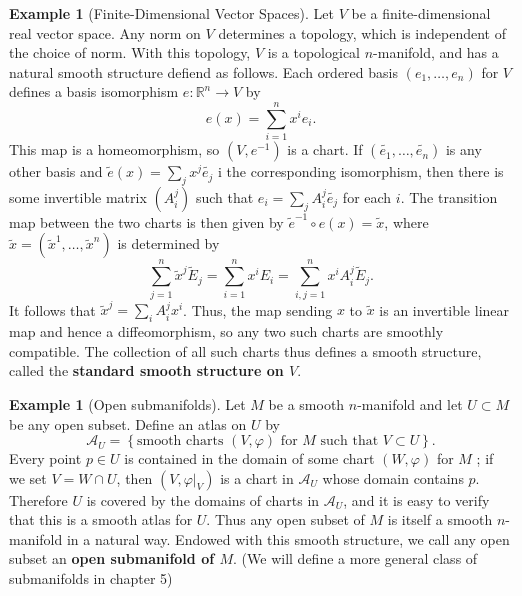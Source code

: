 \documentclass[reqno]{amsart}
\theoremstyle{plain}%
\theoremstyle{definition}
\newtheorem{example}[theorem]{Example}
\theoremstyle{remark}
\begin{document}
        \begin{example}[Finite-Dimensional Vector Spaces]
         Let $V$ be a finite-dimensional real vector space. Any norm on $V$ 
         determines a topology, which is independent of the choice of norm. With
         this topology, $V$ is a topological $n$-manifold, and has a natural smooth
         structure defiend as follows. Each ordered basis
         $\left( e_1, \ldots, e_n \right) $ for $V$ defines a basis isomorphism
         $e  \colon \mathbb{R}^{n} \to V$ by
         \[
         e(x) = \sum_{i=1}^{n} x^{i} e_i.
         \] 
         This map is a homeomorphism, so $\left( V, e^{-1} \right) $ is a chart. If
         $\left( \tilde{e_1}, \ldots,
         \tilde{e_n} \right) $ is any other basis and
         $\tilde{e}(x) = \sum_{j} x^{j}\tilde{e_j} $ i the corresponding
         isomorphism, then there is some invertible matrix
         $\left( A_{i}^{j} \right) $ such that
         $e_i = \sum_j A_{i}^{j} \tilde{e_j}$ for each $i$. The transition map
         between the two charts is then given by
         $\tilde{e}^{-1} \circ e(x) = \tilde{x}$, where $\tilde{x}
         = \left( \tilde{x}^{1},\ldots, \tilde{x}^{n} \right) $
         is determined by
         \[
         \sum_{j=1}^{n} \tilde{x}^{j} \tilde{E}_j =
         \sum_{i=1}^{n} x^{i} E_i = \sum_{i,j=1}^{n} x^{i}A_{i}^{j}\tilde{E}_j.
         \] 
         It follows that $\tilde{x}^{j}=
         \sum_i A_i^{j} x^{i}$. Thus, the map sending $x$ to $\tilde{x}$ is an
         invertible linear map and hence a diffeomorphism, so any two such charts
         are smoothly compatible. The collection of all such charts thus defines
         a smooth structure, called the \textbf{standard smooth structure on $V$}.     
        \end{example}

        \begin{example}[Open submanifolds]
            Let $M$ be a smooth $n$-manifold and let $U \subset M$ be any open subset.
            Define an atlas on $U$ by
            \[
            \mathcal{A}_{U} = \left\{ \text{smooth charts }
            \left( V,\varphi \right) \text{ for }M \text{ such that }
            V \subset U \right\} .
            \] 
            Every point $p \in U$ is contained in the domain of some chart
            $\left( W, \varphi \right) $ for $M$ ; if we set
            $V = W \cap U$, then $\left( V, \varphi|_{V} \right) $ is a chart in
            $\mathcal{A}_U$ whose domain contains $p$. Therefore $U$ is covered by the
            domains of charts in $\mathcal{A}_U$, and it is easy to verify that this is
            a smooth atlas for $U$. Thus any open subset of $M$ is itself a smooth
            $n$-manifold in a natural way. Endowed with this smooth structure, we call
            any open subset an \textbf{open submanifold of $M$}. (We will define a more
            general class of submanifolds in chapter 5)
        \end{example}
        
\end{document}
